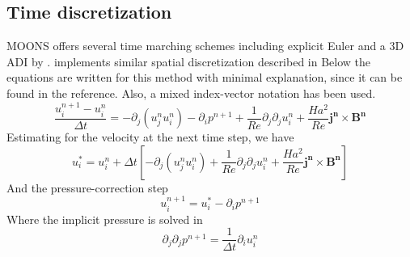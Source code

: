 \documentclass[11pt]{article}
\begin{document}
\subsection{Time discretization}
MOONS offers several time marching schemes including explicit Euler and a 3D ADI by . implements similar spatial discretization described in \cite{griebel1997numerical}
Below the equations are written for this method with minimal explanation, since it can be found in the reference. Also, a mixed index-vector notation has been used.
\begin{equation}
	\frac{u_i^{n+1}- u_i^{n}}{\Delta t} = - \partial_j (u_j^{n} u_i^{n}) 
	-\partial_i  p^{n+1} + 
	\frac{1}{Re} \partial_j \partial_j u_i^{n} + 
	\frac{Ha^2}{Re} \pmb{j^{n}} \times \pmb{B^{n}}
\end{equation}
Estimating for the velocity at the next time step, we have
\begin{equation}
	u_i^* = u_i^{n} + \Delta t \left[ - \partial_j (u_j^{n} u_i^{n}) + 
	\frac{1}{Re} \partial_j \partial_j u_i^{n} + 
	\frac{Ha^2}{Re} \pmb{j^{n}} \times \pmb{B^{n}} \right]
\end{equation}
And the pressure-correction step
\begin{equation}
	u_i^{n+1} = u_i^* -\partial_i p^{n+1}
\end{equation}
Where the implicit pressure is solved in
\begin{equation}
	\partial_j \partial_j p^{n+1} = \frac{1}{\Delta t} \partial_i u_i^n
\end{equation}




\end{document}
